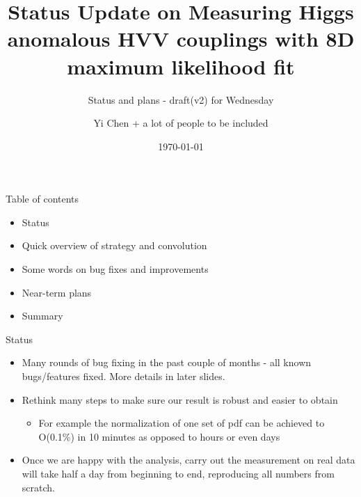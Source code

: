 \documentclass[11pt,t]{beamer}
\title{Status Update on Measuring Higgs anomalous HVV couplings with 8D maximum likelihood fit}
\subtitle{Status and plans - draft(v2) for Wednesday}
\author{Yi Chen + a lot of people to be included}
\institute{California Institute of Technology}
\date{\today}
\begin{document}
\begin{frame}[plain]
   \titlepage
\end{frame}

\begin{frame}{Table of contents}
   \begin{itemize}
   \item Status
   \item Quick overview of strategy and convolution
   \item Some words on bug fixes and improvements
   \item Near-term plans
   \item Summary
   \end{itemize}
\end{frame}

\begin{frame}{Status}
   \begin{itemize}
   \item Many rounds of bug fixing in the past couple of months - all known bugs/features fixed.
   More details in later slides.
   \item Rethink many steps to make sure our result is robust and easier to obtain
      \begin{itemize}
      \item For example the normalization of one set of pdf can be achieved to O(0.1\%) in 10 minutes
      as opposed to hours or even days
      \end{itemize}
   \item Once we are happy with the analysis, carry out the measurement on real data
   will take half a day from beginning to end, reproducing all numbers from scratch.
   \end{itemize}
\end{frame}
\end{document}
